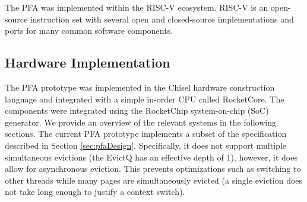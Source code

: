 The PFA was implemented within the RISC-V ecosystem. RISC-V is an open-source
instruction set with several open and closed-source implementations and ports
for many common software components\cite{riscv}.

%
\subsection{Hardware Implementation}
The PFA prototype was implemented in the Chisel hardware construction
language\cite{chisel} and integrated with a simple in-order CPU called
RocketCore\cite{rocketchip}. The components were integrated using the
RocketChip system-on-chip (SoC) generator\cite{rocketchip}. We provide an
overview of the relevant systems in the following sections. The current PFA
prototype implements a subset of the specification described in Section
\ref{sec:pfaDesign}. Specifically, it does not support multiple simultaneous
evictions (the EvictQ has an effective depth of 1), however, it does allow for
asynchronous eviction. This prevents optimizations such as switching to other
threads while many pages are simultaneously evicted (a single eviction does not
take long enough to justify a context switch). 

